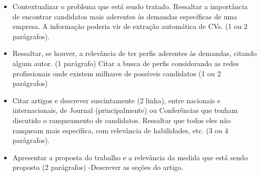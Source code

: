\documentclass[preprint,12pt]{elsarticle}
\begin{document}
\begin{itemize}

\color{blue}
\item Contextualizar o problema que está sendo tratado. Ressaltar a importância de encontrar candidatos mais aderentes às demandas específicas de uma empresa. A informação poderia vir de extração automática de CVs. (1 ou 2 parágrafos). 
\item Ressaltar, se houver, a relevância de ter perfis aderentes às demandas, citando algum autor. (1 parágrafo) Citar a busca de perfis considerando as redes profissionais onde existem milhares de possíveis candidatos (1 ou 2 parágrafos)
\item Citar artigos e descrever suscintamente (2 linha), entre nacionais e internacionais, de Journal (principalmente) ou Conferências que tenham discutido o ranqueamento de candidatos. Ressaltar que todos eles não ranqueam mais específica, com relevância de habilidades, etc. (3 ou 4 parágrafos).
\item Apresentar a proposta do trabalho e a relevância da medida que está sendo proposta (2 parágrafos)
-Descrever as seções do artigo.

\end{itemize}
\end{document}
